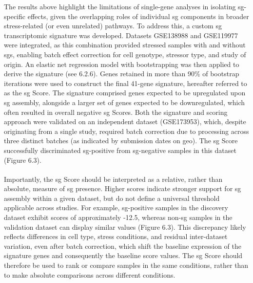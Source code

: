 {The results above highlight the limitations of single-gene analyses in isolating \gls{sg}-specific effects, given the overlapping roles of individual \gls{sg} components in broader stress-related (or even unrelated) pathways. To address this, a custom \gls{sg} transcriptomic signature was developed. Datasets  GSE138988\cite{matheny_transcriptome-wide_2019} and GSE119977\cite{matheny_rna_2021, matheny_corrigendum_2023} were integrated, as this combination provided stressed samples with and without \glspl{sg}, enabling batch effect correction for cell genotype, stressor type, and study of origin. An elastic net regression model with bootstrapping was then applied to derive the signature (see 6.2.6). Genes retained in more than 90\% of bootstrap iterations were used to construct the final 41-gene signature, hereafter referred to as the \gls{sg} Score. The signature comprised genes expected to be upregulated upon \gls{sg} assembly, alongside a larger set of genes expected to be downregulated, which often resulted in overall negative \gls{sg} Scores. Both the signature and scoring approach were validated on an independent dataset (GSE173953\cite{paget_stress_2023}), which, despite originating from a single study, required batch correction due to processing across three distinct batches (as indicated by submission dates on \gls{geo}). The \gls{sg} Score successfully discriminated \gls{sg}-positive from \gls{sg}-negative samples in this dataset (Figure 6.3).
\\
\\
Importantly, the \gls{sg} Score should be interpreted as a relative, rather than absolute, measure of \gls{sg} presence. Higher scores indicate stronger support for \gls{sg} assembly within a given dataset, but do not define a universal threshold applicable across studies. For example, \gls{sg}-positive samples in the discovery dataset exhibit scores of approximately -12.5, whereas non-\gls{sg} samples in the validation dataset can display similar values (Figure 6.3). This discrepancy likely reflects differences in cell type, stress conditions, and residual inter-dataset variation, even after batch correction, which shift the baseline expression of the signature genes and consequently the baseline score values. The \gls{sg} Score should therefore be used to rank or compare samples in the same conditions, rather than to make absolute comparisons across different conditions.

}
